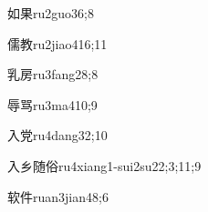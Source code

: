 \begin{verbete}{如果}{ru2guo3}{6;8}
\end{verbete}

\begin{verbete}{儒教}{ru2jiao4}{16;11}
\end{verbete}

\begin{verbete}{乳房}{ru3fang2}{8;8}
\end{verbete}

\begin{verbete}{辱骂}{ru3ma4}{10;9}
\end{verbete}

\begin{verbete}{入党}{ru4dang3}{2;10}
\end{verbete}

\begin{verbete}{入乡随俗}{ru4xiang1-sui2su2}{2;3;11;9}
\end{verbete}

\begin{verbete}{软件}{ruan3jian4}{8;6}
\end{verbete}

